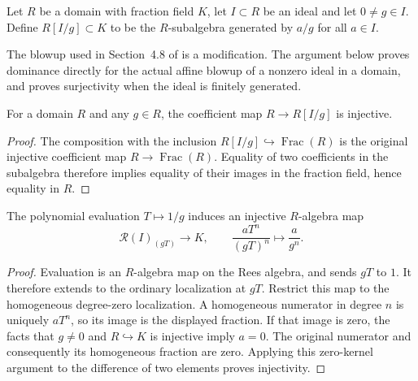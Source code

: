 \endgroup

\begingroup

\begin{definition}
\label{def:affine-blowup-fraction-chart}
\leanok
Let $R$ be a domain with fraction field $K$, let $I\subset R$ be an ideal and
let $0\ne g\in I$. Define $R[I/g]\subset K$ to be the $R$-subalgebra generated by
$a/g$ for all $a\in I$.
\end{definition}

\endgroup

\begingroup

The blowup used in Section~4.8 of \cite{deJong1996} is a modification.
The argument below proves dominance directly for the actual affine blowup
of a nonzero ideal in a domain, and proves surjectivity when the ideal is
finitely generated.

\begin{lemma}
\label{lem:affine-blowup-chart-coefficients-injective}
\leanok
For a domain $R$ and any $g\in R$, the coefficient map $R\to R[I/g]$ is
injective.
\end{lemma}
\begin{proof}
The composition with the inclusion $R[I/g]\hookrightarrow\operatorname{Frac}(R)$
is the original injective coefficient map $R\to\operatorname{Frac}(R)$.
Equality of two coefficients in the subalgebra therefore implies equality
of their images in the fraction field, hence equality in $R$.
\end{proof}

\endgroup

\begingroup

\begin{lemma}
\label{lem:affine-blowup-chart-evaluation}
\leanok
The polynomial evaluation $T\mapsto1/g$ induces an injective $R$-algebra map
\[
\mathcal R(I)_{(gT)}\longrightarrow K,
\qquad \frac{aT^n}{(gT)^n}\longmapsto\frac a{g^n}.
\]
\end{lemma}
\begin{proof}
Evaluation is an $R$-algebra map on the Rees algebra, and sends $gT$ to $1$.
It therefore extends to the ordinary localization at $gT$. Restrict this map
to the homogeneous degree-zero localization. A homogeneous numerator in degree
$n$ is uniquely $aT^n$, so its image is the displayed fraction. If that image
is zero, the facts that $g\ne0$ and $R\hookrightarrow K$ is injective imply
$a=0$. The original numerator and consequently its homogeneous fraction are
zero. Applying this zero-kernel argument to the difference of two elements
proves injectivity.
\end{proof}

